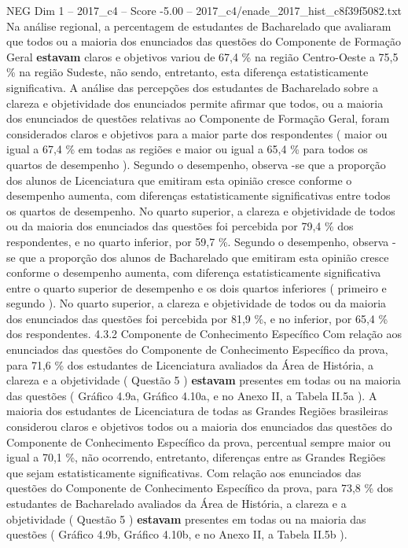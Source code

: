 \begin{textsample}{NEG Dim 1 – 2017\_c4 – Score -5.00 – 2017\_c4/enade\_2017\_hist\_c8f39f5082.txt}
Na análise regional, a percentagem de estudantes de Bacharelado que avaliaram que todos ou a maioria dos enunciados das questões do Componente de Formação Geral \textbf{estavam} claros e objetivos variou de 67,4 \% na região Centro-Oeste a 75,5 \% na região Sudeste, não sendo, entretanto, esta diferença estatisticamente significativa.
A análise das percepções dos estudantes de Bacharelado sobre a clareza e objetividade dos enunciados permite afirmar que todos, ou a maioria dos enunciados de questões relativas ao Componente de Formação Geral, foram considerados claros e objetivos para a maior parte dos respondentes ( maior ou igual a 67,4 \% em todas as regiões e maior ou igual a 65,4 \% para todos os quartos de desempenho ).
Segundo o desempenho, observa -se que a proporção dos alunos de Licenciatura que emitiram esta opinião cresce conforme o desempenho aumenta, com diferenças estatisticamente significativas entre todos os quartos de desempenho.
No quarto superior, a clareza e objetividade de todos ou da maioria dos enunciados das questões foi percebida por 79,4 \% dos respondentes, e no quarto inferior, por 59,7 \%.
Segundo o desempenho, observa -se que a proporção dos alunos de Bacharelado que emitiram esta opinião cresce conforme o desempenho aumenta, com diferença estatisticamente significativa entre o quarto superior de desempenho e os dois quartos inferiores ( primeiro e segundo ).
No quarto superior, a clareza e objetividade de todos ou da maioria dos enunciados das questões foi percebida por 81,9 \%, e no inferior, por 65,4 \% dos respondentes. 4.3.2 Componente de Conhecimento Específico Com relação aos enunciados das questões do Componente de Conhecimento Específico da prova, para 71,6 \% dos estudantes de Licenciatura avaliados da Área de História, a clareza e a objetividade ( Questão 5 ) \textbf{estavam} presentes em todas ou na maioria das questões ( Gráfico 4.9a, Gráfico 4.10a, e no Anexo II, a Tabela II.5a ).
A maioria dos estudantes de Licenciatura de todas as Grandes Regiões brasileiras considerou claros e objetivos todos ou a maioria dos enunciados das questões do Componente de Conhecimento Específico da prova, percentual sempre maior ou igual a 70,1 \%, não ocorrendo, entretanto, diferenças entre as Grandes Regiões que sejam estatisticamente significativas.
Com relação aos enunciados das questões do Componente de Conhecimento Específico da prova, para 73,8 \% dos estudantes de Bacharelado avaliados da Área de História, a clareza e a objetividade ( Questão 5 ) \textbf{estavam} presentes em todas ou na maioria das questões ( Gráfico 4.9b, Gráfico 4.10b, e no Anexo II, a Tabela II.5b ).

\end{textsample}
